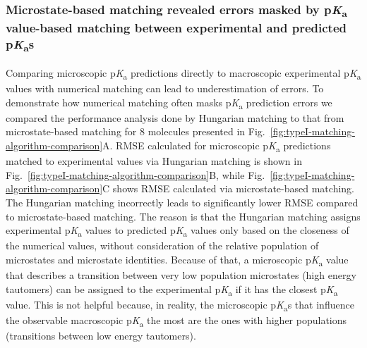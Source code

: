 \documentclass[9pt,lineno,final]{elife}
\newcommand{\pKa}{p\textit{K}\textsubscript{a}}
\begin{document}
\subsubsection{Microstate-based matching revealed errors masked by \pKa{} value-based matching between experimental and predicted \pKa{}s}

Comparing microscopic \pKa{} predictions directly to macroscopic experimental \pKa{} values with numerical matching can lead to underestimation of errors. 
To demonstrate how numerical matching often masks \pKa{} prediction errors we compared the performance analysis done by Hungarian matching to that from microstate-based matching for 8 molecules presented in Fig.~\ref{fig:typeI-matching-algorithm-comparison}A. RMSE calculated for microscopic \pKa{} predictions matched to experimental values via Hungarian matching is shown in Fig.~\ref{fig:typeI-matching-algorithm-comparison}B, while Fig.~\ref{fig:typeI-matching-algorithm-comparison}C shows RMSE calculated via microstate-based matching. 
The Hungarian matching incorrectly leads to significantly lower RMSE compared to microstate-based matching. The reason is that the Hungarian matching assigns experimental \pKa{} values to predicted \pKa{} values only based on the closeness of the numerical values, without consideration of the relative population of microstates and microstate identities. 
Because of that, a microscopic \pKa{} value that describes a transition between very low population microstates (high energy tautomers) can be assigned to the experimental \pKa{} if it has the closest \pKa{} value. 
This is not helpful because, in reality, the microscopic \pKa{}s that influence the observable macroscopic \pKa{} the most are the ones with higher populations (transitions between low energy tautomers).
\end{document}
